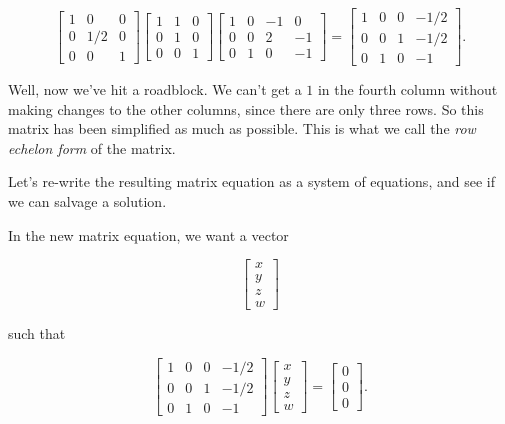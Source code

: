 \documentclass{ximera}
\begin{document}
\begin{exploration}
\begin{example}
\begin{equation*}
  \begin{bmatrix}
    1 & 0 & 0 \\
    0 & 1/2 & 0 \\
    0 & 0 & 1
  \end{bmatrix} \begin{bmatrix}
    1 & 1 & 0 \\
    0 & 1 & 0 \\
    0 & 0 & 1
  \end{bmatrix} \begin{bmatrix}
    1 & 0 & -1 & 0 \\
    0 & 0 & 2 & -1 \\
    0 & 1 & 0 & -1
  \end{bmatrix} = \begin{bmatrix}
    1 & 0 & 0 & -1/2 \\
    0 & 0 & 1 & -1/2 \\
    0 & 1 & 0 & -1
  \end{bmatrix}.
\end{equation*}

Well, now we've hit a roadblock. We can't get a $1$ in the fourth column without making changes to the other columns, since there are only three rows. So this matrix has been simplified as much as possible. This is what we call the \emph{row echelon form} of the matrix.

Let's re-write the resulting matrix equation as a system of equations, and see if we can salvage a solution.

In the new matrix equation, we want a vector 

$$\begin{bmatrix} x \\ y \\ z \\ w \end{bmatrix}$$

such that

$$\begin{bmatrix}
    1 & 0 & 0 & -1/2 \\
    0 & 0 & 1 & -1/2 \\
    0 & 1 & 0 & -1
  \end{bmatrix} \begin{bmatrix} x \\ y \\ z \\ w \end{bmatrix} = \begin{bmatrix} 0 \\ 0 \\ 0 \end{bmatrix}.$$



\end{example}
\end{exploration}
\end{document}
